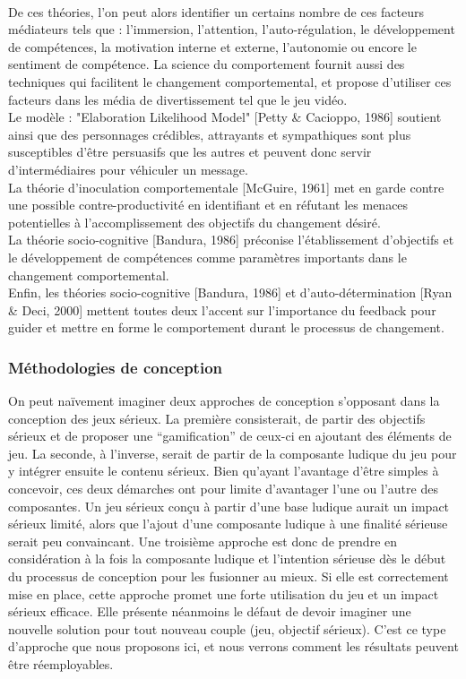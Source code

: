 \paragraph{}De ces théories, l’on peut alors identifier un certains nombre de ces facteurs médiateurs tels que : l’immersion, l’attention, l’auto-régulation, le développement de compétences, la motivation interne et externe, l’autonomie ou encore le sentiment de compétence. La science du comportement fournit aussi des techniques qui facilitent le changement comportemental, et propose d’utiliser ces facteurs dans les média de divertissement tel que le jeu vidéo.\\
Le modèle : "Elaboration Likelihood Model" [Petty \& Cacioppo, 1986] soutient ainsi que des personnages crédibles, attrayants et sympathiques sont plus susceptibles d’être persuasifs que les autres et peuvent donc servir d’intermédiaires pour véhiculer un message. \\
La théorie d’inoculation comportementale [McGuire, 1961] met en garde contre une possible contre-productivité en identifiant et en réfutant les menaces potentielles à l’accomplissement des objectifs du changement désiré.\\
La théorie socio-cognitive [Bandura, 1986] préconise l’établissement d’objectifs et le développement de compétences comme paramètres importants dans le changement comportemental.\\
Enfin, les théories socio-cognitive [Bandura, 1986] et d’auto-détermination [Ryan \& Deci, 2000] mettent toutes deux l’accent sur l’importance du feedback pour guider et mettre en forme le comportement durant le processus de changement.	

	\subsubsection{Méthodologies de conception}
On peut naïvement imaginer deux approches de conception s’opposant dans la conception des jeux sérieux. La première consisterait, de partir des objectifs sérieux et de proposer une “gamification” de ceux-ci en ajoutant des éléments de jeu. La seconde, à l’inverse, serait de partir de la composante ludique du jeu pour y intégrer ensuite le contenu sérieux. Bien qu’ayant l’avantage d’être simples à concevoir, ces deux démarches ont pour limite d’avantager l’une ou l’autre des composantes. Un jeu sérieux conçu à partir d’une base ludique aurait un impact sérieux limité, alors que l’ajout d’une composante ludique à une finalité sérieuse serait peu convaincant.
Une troisième approche est donc de prendre en considération à la fois la composante ludique et l’intention sérieuse dès le début du processus de conception pour les fusionner au mieux. Si elle est correctement mise en place, cette approche promet une forte utilisation du jeu et un impact sérieux efficace. Elle présente néanmoins le défaut de devoir imaginer une nouvelle solution pour tout nouveau couple (jeu, objectif sérieux). C’est ce type d’approche que nous proposons ici, et nous verrons comment les résultats peuvent être réemployables.

